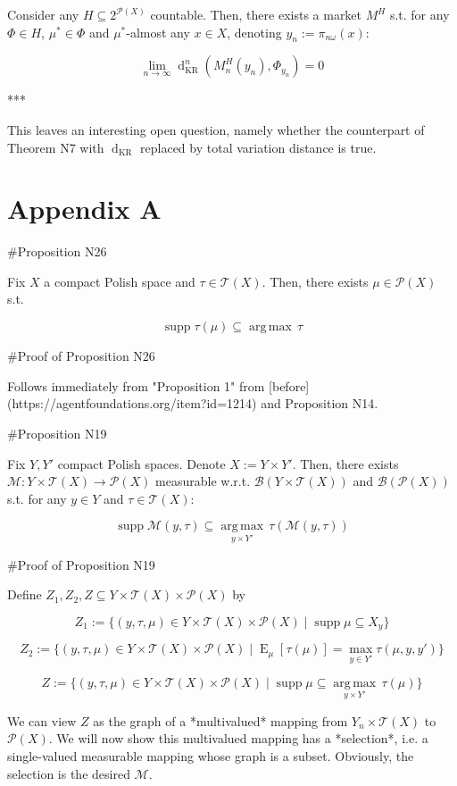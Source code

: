 \documentclass[a4paper]{article}
\DeclareMathOperator{\Supp}{supp}
\DeclareMathOperator{\E}{E}
\newcommand{\Argmax}[1]{\underset{#1}{\operatorname{arg\,max}}\,}
\newcommand{\Prob}{\mathcal{P}}
\newcommand{\T}{\mathcal{T}}
\newcommand{\B}{\mathcal{B}}
\newcommand{\Dkr}{\operatorname{d}_{\text{KR}}}
\begin{document}
Consider any ${H \subseteq 2^{\Prob(X)}}$ countable. Then, there exists a market ${M^H}$ s.t. for any ${\Phi \in H}$, ${\mu^* \in \Phi}$ and ${\mu^*}$-almost any ${x \in X}$, denoting ${y_n:=\pi_{n\omega}(x)}$:

$$\lim_{n \rightarrow \infty} \Dkr^n(M^H_n(y_n),\Phi_{y_n}) = 0$$

***

This leaves an interesting open question, namely whether the counterpart of Theorem N7 with ${\Dkr}$ replaced by total variation distance is true.

\section{Appendix A}

\#Proposition N26

Fix ${X}$ a compact Polish space and ${\tau \in \T(X)}$. Then, there exists ${\mu \in \Prob(X)}$ s.t.

$$\Supp \tau(\mu) \subseteq \Argmax{} \tau$$

\#Proof of Proposition N26

Follows immediately from "Proposition 1" from [before](https://agentfoundations.org/item?id=1214) and Proposition N14.

\#Proposition N19

Fix ${Y,Y'}$ compact Polish spaces. Denote ${X:=Y \times Y'}$. Then, there exists ${\mathcal{M}: Y \times \T(X) \rightarrow \Prob(X)}$ measurable w.r.t. ${\B(Y \times \T(X))}$ and ${\B(\Prob(X))}$ s.t. for any ${y \in Y}$ and ${\tau \in \T(X)}$:


$$\Supp \mathcal{M}(y,\tau) \subseteq \Argmax{y \times Y'} \tau(\mathcal{M}(y,\tau))$$

\#Proof of Proposition N19

Define ${Z_1, Z_2, Z \subseteq Y \times \T(X) \times \Prob(X)}$ by

$${Z_1:=\{(y,\tau,\mu) \in Y \times \T(X) \times \Prob(X) \mid \Supp \mu \subseteq X_y\}}$$

$${Z_2:=\{(y,\tau,\mu) \in Y \times \T(X) \times \Prob(X) \mid \E_\mu[\tau(\mu)] = \max_{y \in Y'} \tau(\mu,y,y')\}}$$

$${Z:=\{(y,\tau,\mu) \in Y \times \T(X) \times \Prob(X) \mid \Supp \mu \subseteq \Argmax{y \times Y'} \tau(\mu)\}}$$

We can view ${Z}$ as the graph of a *multivalued* mapping from ${Y_n \times \T(X)}$ to ${\Prob(X)}$. We will now show this multivalued mapping has a *selection*, i.e. a single-valued measurable mapping whose graph is a subset. Obviously, the selection is the desired ${\mathcal{M}}$.
\end{document}
